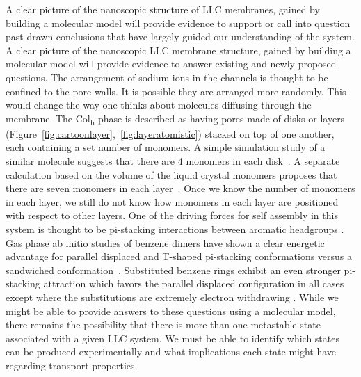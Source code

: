 A clear picture of the nanoscopic structure of LLC membranes, gained by
building a molecular model will provide evidence to support or call
into question past drawn conclusions that have largely guided our 
understanding of the system. 
A clear picture of the nanoscopic LLC membrane structure, gained by building 
a molecular model will provide evidence to answer existing and newly proposed
questions.
The arrangement of sodium ions
in the channels is thought to be confined to the pore walls. It is 
possible they are arranged more randomly. This would change the way
one thinks about molecules diffusing through the membrane. The
Col\textsubscript{h} phase is described as having pores made of disks or
layers (Figure~\ref{fig:cartoonlayer},~\ref{fig:layeratomistic}) stacked
on top of one another, each containing a set number of monomers. A 
simple simulation study of a similar molecule suggests that there are 4
monomers in each disk~\cite{zhu_methacrylated_2006}. A separate calculation
based on the volume of the liquid crystal monomers proposes that there 
are seven monomers in each layer~\cite{resel_structural_2000}. Once we %
know the number of monomers in each layer, we still do not know how 
monomers in each layer are positioned with respect to other layers. 
One of the driving forces for self %
assembly in this system is thought to be pi-stacking interactions
between aromatic headgroups \cite{gazit_possible_2002}. Gas phase ab
initio studies of benzene dimers have shown a clear energetic advantage
for parallel displaced and T-shaped pi-stacking conformations versus a
sandwiched conformation~\cite{sinnokrot_estimates_2002}.
Substituted benzene rings exhibit an even stronger pi-stacking 
attraction which favors the parallel displaced configuration in all cases
except where the substitutions are extremely electron withdrawing
\cite{waller_hybrid_2006,ringer_effect_2006}. While we might be able to
provide answers to these questions using a molecular model, there remains
the possibility that there is more than one metastable state associated
with a given LLC system. We must be able to identify which states can
be produced experimentally and what implications each state might have
regarding transport properties.

